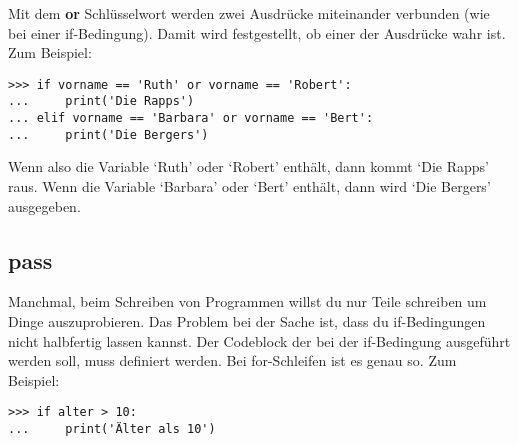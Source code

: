 Mit dem \textbf{or} Schlüsselwort werden zwei Ausdrücke miteinander verbunden (wie bei einer if-Bedingung). Damit wird festgestellt, ob einer der Ausdrücke wahr ist. Zum Beispiel:

\begin{Verbatim}[frame=single]
>>> if vorname == 'Ruth' or vorname == 'Robert':
...     print('Die Rapps')
... elif vorname == 'Barbara' or vorname == 'Bert':
...     print('Die Bergers')
\end{Verbatim}

Wenn also die Variable  `Ruth' oder `Robert' enthält, dann kommt `Die Rapps' raus. Wenn die Variable `Barbara' oder `Bert' enthält, dann wird `Die Bergers' ausgegeben.

\subsection*{pass}

Manchmal, beim Schreiben von Programmen willst du nur Teile schreiben um Dinge auszuprobieren. Das Problem bei der Sache ist, dass du if-Bedingungen nicht halbfertig lassen kannst. Der Codeblock der bei der if-Bedingung ausgeführt werden soll, muss definiert werden. Bei for-Schleifen ist es genau so. Zum Beispiel: 

\begin{Verbatim}[frame=single]
>>> if alter > 10:
...     print('Älter als 10')
\end{Verbatim}

